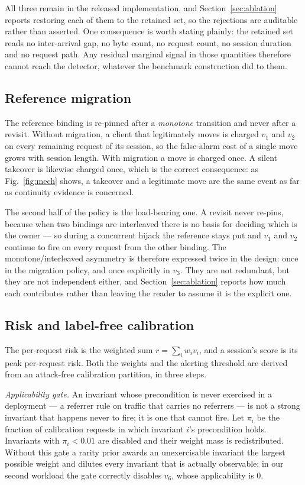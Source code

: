 \documentclass[conference]{IEEEtran}
\begin{document}
All three remain in the released implementation, and
Section~\ref{sec:ablation} reports restoring each of them to the retained set,
so the rejections are auditable rather than asserted.  One consequence is worth
stating plainly: the retained set reads no inter-arrival gap, no byte count, no
request count, no session duration and no request path.  Any residual marginal
signal in those quantities therefore cannot reach the detector, whatever the
benchmark construction did to them.

\subsection{Reference migration}

The reference binding is re-pinned after a \emph{monotone} transition and never
after a revisit.  Without migration, a client that legitimately moves is charged
$v_1$ and $v_2$ on every remaining request of its session, so the false-alarm
cost of a single move grows with session length.  With migration a move is
charged once.  A silent takeover is likewise charged once, which is the correct
consequence: as Fig.~\ref{fig:mech} shows, a takeover and a legitimate move are
the same event as far as continuity evidence is concerned.

The second half of the policy is the load-bearing one.  A revisit never re-pins,
because when two bindings are interleaved there is no basis for deciding which is
the owner --- so during a concurrent hijack the reference stays put and $v_1$ and
$v_2$ continue to fire on every request from the other binding.  The
monotone/interleaved asymmetry is therefore expressed twice in the design: once
in the migration policy, and once explicitly in $v_3$.  They are not redundant,
but they are not independent either, and Section~\ref{sec:ablation} reports how
much each contributes rather than leaving the reader to assume it is the
explicit one.

\subsection{Risk and label-free calibration}
\label{sec:calibration}

The per-request risk is the weighted sum $r=\sum_i w_i v_i$, and a session's
score is its peak per-request risk.  Both the weights and the alerting threshold
are derived from an attack-free calibration partition, in three steps.

\emph{Applicability gate.}  An invariant whose precondition is never exercised
in a deployment --- a referrer rule on traffic that carries no referrers --- is
not a strong invariant that happens never to fire; it is one that cannot fire.
Let $\pi_i$ be the fraction of calibration requests in which invariant $i$'s
precondition holds.  Invariants with $\pi_i<0.01$ are disabled and their weight
mass is redistributed.  Without this gate a rarity prior awards an
unexercisable invariant the largest possible weight and dilutes every invariant
that is actually observable; in our second workload the gate correctly disables
$v_6$, whose applicability is $0$.
\end{document}
